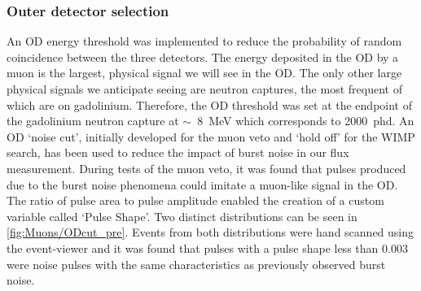 \subsubsection{Outer detector selection}\label{sec:Muons/MuonFluxODSelection}
An OD energy threshold was implemented to reduce the probability of random coincidence between the three detectors. The energy deposited in the OD by a muon is the largest, physical signal we will see in the OD. The only other large physical signals we anticipate seeing are neutron captures, the most frequent of which are on gadolinium. Therefore, the OD threshold was set at the endpoint of the gadolinium neutron capture at $\sim$~8~MeV which corresponds to 2000~phd.
An OD `noise cut', initially developed for the muon veto and `hold off' for the WIMP search, has been used to reduce the impact of burst noise in our flux measurement. During tests of the muon veto, it was found that pulses produced due to the burst noise phenomena could imitate a muon-like signal in the OD. The ratio of pulse area to pulse amplitude enabled the creation of a custom variable called `Pulse Shape'.
Two distinct distributions can be seen in \autoref{fig:Muons/ODcut_pre}. Events from both distributions were hand scanned using the event-viewer and it was found that pulses with a pulse shape less than 0.003 were noise pulses with the same characteristics as previously observed burst noise. 
